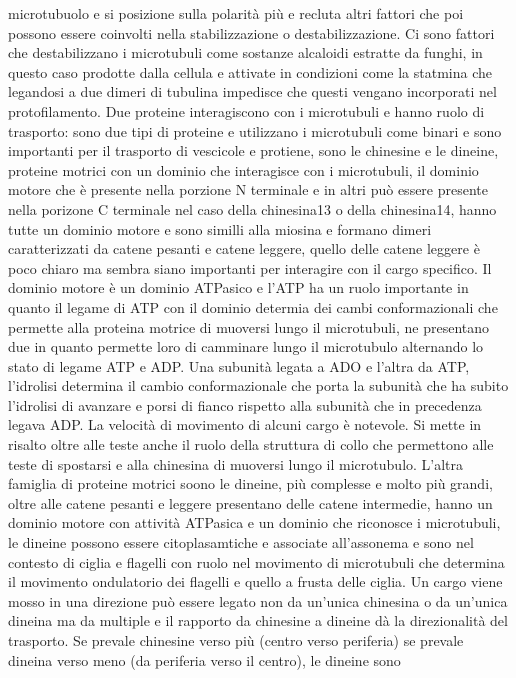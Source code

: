 microtubuolo e si posizione sulla polarit\`a pi\`u e recluta altri fattori che poi possono essere coinvolti nella stabilizzazione o destabilizzazione. Ci sono fattori che destabilizzano
i microtubuli come sostanze alcaloidi estratte da funghi, in questo caso prodotte dalla cellula e attivate in condizioni come la  statmina che legandosi a due dimeri di tubulina impedisce
che questi vengano incorporati nel protofilamento. Due proteine interagiscono con i microtubuli e hanno ruolo di trasporto: sono due tipi di proteine e utilizzano i microtubuli come 
binari e sono importanti per il trasporto di vescicole e protiene, sono le chinesine e le dineine, proteine motrici con un dominio che interagisce con i microtubuli, il dominio motore
che \`e presente nella porzione N terminale e in altri pu\`o essere presente nella porizone C terminale nel caso della chinesina13 o della chinesina14, hanno tutte un dominio motore
e sono similli alla miosina e formano dimeri caratterizzati da catene pesanti e catene leggere, quello delle catene leggere \`e poco chiaro ma sembra siano importanti per interagire con
il cargo specifico. Il dominio motore \`e un dominio ATPasico e l'ATP ha un ruolo importante in quanto il legame di ATP con il dominio determia dei cambi conformazionali che permette
alla proteina motrice di muoversi lungo il microtubuli, ne presentano due in quanto permette loro di camminare lungo il microtubulo alternando lo stato di legame ATP e ADP. Una
subunit\`a legata a ADO e l'altra da ATP, l'idrolisi determina il cambio conformazionale che porta la subunit\`a che ha subito l'idrolisi di avanzare e porsi di fianco rispetto alla
subunit\`a che in precedenza legava ADP. La velocit\`a di movimento di alcuni cargo \`e notevole. Si mette in risalto oltre alle teste anche il ruolo della struttura di collo che 
permettono alle teste di spostarsi e alla chinesina di muoversi lungo il microtubulo. L'altra famiglia di proteine motrici soono le dineine, pi\`u complesse e molto pi\`u grandi, oltre
alle catene pesanti e leggere presentano delle catene intermedie, hanno un dominio motore con attivit\`a ATPasica e un dominio che riconosce i microtubuli, le dineine possono 
essere citoplasamtiche e associate all'assonema e sono nel contesto di ciglia e flagelli con ruolo nel movimento di microtubuli che determina il movimento ondulatorio dei flagelli e 
quello a frusta delle ciglia. Un cargo viene mosso in una direzione pu\`o essere legato non da un'unica chinesina o da un'unica dineina ma da multiple e il rapporto da chinesine a 
dineine d\`a la direzionalit\`a del trasporto. Se prevale chinesine verso pi\`u (centro verso periferia) se prevale dineina verso meno (da periferia verso il centro), le dineine sono

